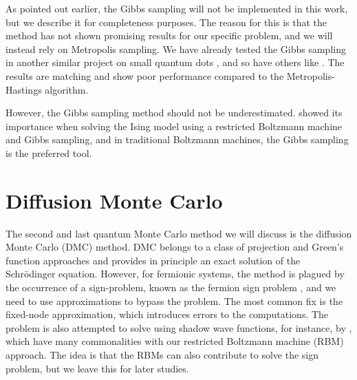 As pointed out earlier, the Gibbs sampling will not be implemented in this work, but we describe it for completeness purposes. The reason for this is that the method has not shown promising results for our specific problem, and we will instead rely on Metropolis sampling. We have already tested the Gibbs sampling in another similar project on small quantum dots \supercite{nordhagen_computational_2018}, and so have others like \citet{flugsrud_vilde_moe_solving_nodate}. The results are matching and show poor performance compared to the Metropolis-Hastings algorithm.

However, the Gibbs sampling method should not be underestimated. \citet{carleo_solving_2017} showed its importance when solving the Ising model using a restricted Boltzmann machine and Gibbs sampling, and in traditional Boltzmann machines, the Gibbs sampling is the preferred tool.

\section{Diffusion Monte Carlo} \label{sec:dmc}
The second and last quantum Monte Carlo method we will discuss is the diffusion Monte Carlo (DMC) method. DMC belongs to a class of projection and Green's function approaches and provides in principle an exact solution of the Schrödinger equation. However, for fermionic systems, the method is plagued by the occurrence of a sign-problem, known as the fermion sign problem \supercite{troyer_computational_2005}, and we need to use approximations to bypass the problem. The most common fix is the fixed-node approximation, which introduces errors to the computations. The problem is also attempted to solve using shadow wave functions, for instance, by \citet{calcavecchia_sign_2014}, which have many commonalities with our restricted Boltzmann machine (RBM) approach. The idea is that the RBMs can also contribute to solve the sign problem, but we leave this for later studies. 

